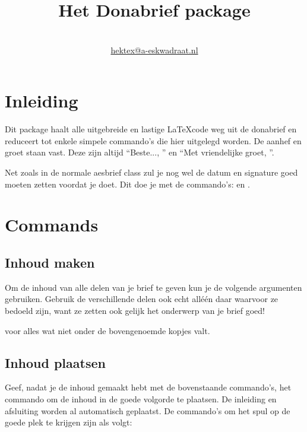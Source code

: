 \documentclass{article}
\title{Het Donabrief package} %
\author{\aeskwadraat \TeXniCie\\
\url{hektex@a-eskwadraat.nl}}
\begin{document}
\maketitle

\section{Inleiding}
Dit package haalt alle uitgebreide en lastige \LaTeX code weg uit de donabrief en reduceert tot enkele simpele commando's die hier uitgelegd worden. De aanhef en groet staan vast. Deze zijn altijd ``Beste..., '' en ``Met vriendelijke groet, ''.

Net zoals in de normale aesbrief class zul je nog wel de datum en signature goed moeten zetten voordat je  doet. Dit doe je met de commando's: en .

\section{Commands}
\subsection{Inhoud maken}
Om de inhoud van alle delen van je brief te geven kun je de volgende argumenten gebruiken. Gebruik de verschillende delen ook echt all\'e\'en daar waarvoor ze bedoeld zijn, want ze zetten ook gelijk het onderwerp van je brief goed!







 voor alles wat niet onder de bovengenoemde kopjes valt.

\subsection{Inhoud plaatsen}
Geef, nadat je de inhoud gemaakt hebt met de bovenstaande commando's, het  commando om de inhoud in de goede volgorde te plaatsen.
 De inleiding en afsluiting worden al automatisch geplaatst. De commando's om het spul op de goede plek te krijgen zijn als volgt:
\end{document}
